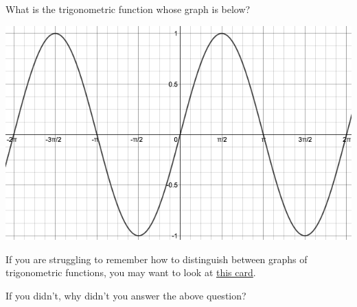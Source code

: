 \documentclass{ximera}
\begin{document}
\begin{problem} 

\begin{problem}
    What is the trigonometric function whose graph is below?
    
    \begin{center} \includegraphics[scale=0.3]{TrigGraph.png} \end{center}
    
    \begin{hint}
    If you are struggling to remember how to distinguish between graphs of trigonometric functions, you may want to look at \href{https://ximera.osu.edu/math160fa17/m160prerequisites/reviewOfFamousFunctions/digInTrigonometricFunctions}{this card}.
    \end{hint}

  \begin{multipleChoice}
      
      
  \end{multipleChoice}
  
\end{problem}

\begin{question}
  
    If you didn't, why didn't you answer the above question?
  
  \begin{multipleChoice}
      
  \end{multipleChoice}
  
\end{question}

\end{problem}
\end{document}
